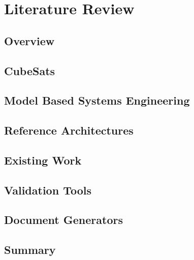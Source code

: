 \documentclass[12pt,letterpaper,oneside]{book}
\begin{document}
	\chapter{Literature Review}
    \label{LitReview}
 
        \section{Overview}
        \label{LitOver}
   		
        
        \section{CubeSats}
        \label{CubeSats}
   		
   		
   	    \section{Model Based Systems Engineering}
        \label{MBSE}
   		

   	    \section{Reference Architectures}
        \label{RefArch}
   		

   		\section{Existing Work}
        \label{Existing_Work}
   		
 
    	\section{Validation Tools}
        \label{Validation ruleset}
   		
   		
   		\section{Document Generators}
        \label{Document Generators}
   		
   		
        \section{Summary}
        \label{Ch2Sum}
   		
        
\end{document}
